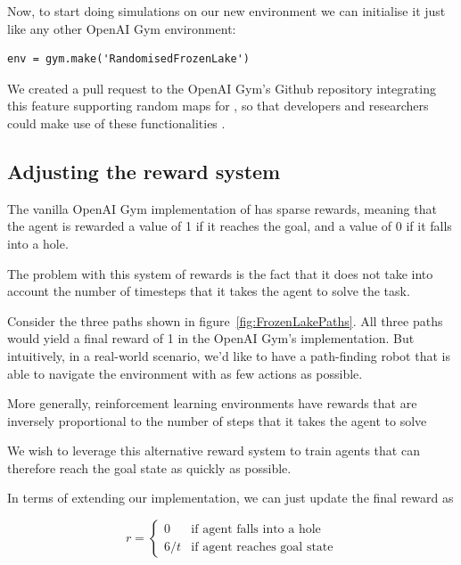 Now, to start doing simulations on our new environment we can initialise it just like any other OpenAI Gym environment:

\begin{minipage}{\linewidth}
\lstset{language=Python}
\lstset{basicstyle=\footnotesize}
\begin{lstlisting}
env = gym.make('RandomisedFrozenLake')
\end{lstlisting}
\end{minipage}

We created a pull request to the OpenAI Gym's Github repository integrating this feature supporting random maps for , so that developers and researchers could make use of these functionalities \parencite{Addabili86:online}.

\subsection{Adjusting the reward system}
\label{sec:adjrewardsys}
The vanilla OpenAI Gym implementation of  has sparse rewards, meaning that the agent is rewarded a value of 1 if it reaches the goal, and a value of 0 if it falls into a hole.

The problem with this system of rewards is the fact that it does not take into account the number of timesteps that it takes the agent to solve the task.

Consider the three paths shown in figure~\ref{fig:FrozenLakePaths}. All three paths would yield a final reward of 1 in the OpenAI Gym's implementation. But intuitively, in a real-world scenario, we'd like to have a path-finding robot that is able to navigate the environment with as few actions as possible.

More generally, reinforcement learning environments have rewards that are inversely proportional to the number of steps that it takes the agent to solve \citep{bellemare2013arcade, 1606.01540, zamora2016extending}

We wish to leverage this alternative reward system to train agents that can therefore reach the goal state as quickly as possible.

In terms of extending our  implementation, we can just update the final reward as 

\[
r =
\left\{
	\begin{array}{ll}
		0   & \mbox{if agent falls into a hole}\\
		6/t & \mbox{if agent reaches goal state}
	\end{array}
\right.
\]

